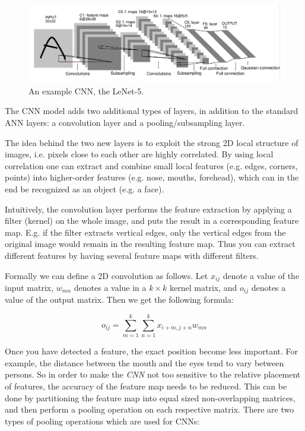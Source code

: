 \begin{figure}[h!]
  \centering
      \includegraphics[width=1.0\textwidth]{Figures/Background/convnet}
  \caption{An example CNN, the LeNet-5\cite{LeCun1998}. }
\end{figure}

The CNN model adds two additional types of layers, in addition to the standard ANN layers: a convolution layer and a pooling/subsampling layer.

The idea behind the two new layers is to exploit the strong 2D local structure of images, i.e. pixels close to each other are highly correlated. By using local correlation one can extract and combine small local features (e.g. edges, corners, points) into higher-order features (e.g. nose, mouths, forehead), which can in the end be recognized as an object (e.g. a face). 

Intuitively, the convolution layer performs the feature extraction by applying a filter (kernel) on the whole image, and puts the result in a corresponding feature map. E.g. if the filter extracts vertical edges, only the vertical edges from the original image would remain in the resulting feature map. Thus you can extract different features by having several feature maps with different filters.  

Formally we can define a 2D convolution as follows. Let $ x_{ij} $ denote a value of the input matrix, $ w_{mn} $ denotes a value in a $ k \times k $ kernel matrix, and $ o_{ij} $ denotes a value of the output matrix. Then we get the following formula:

\begin{equation*}
o_{ij} = \sum_{m=1}^{k}\sum_{n=1}^{k} x_{i+m, j+n}w_{mn}
\end{equation*}


Once you have detected a feature, the exact position become less important. For example, the distance between the mouth and the eyes tend to vary between persons. So in order to make the \textit{CNN} not too sensitive to the relative placement of features, the accuracy of the feature map needs to be reduced. This can be done by partitioning the feature map into equal sized non-overlapping matrices, and then perform a pooling operation on each respective matrix. There are two types of pooling operations which are used for CNNs: 

